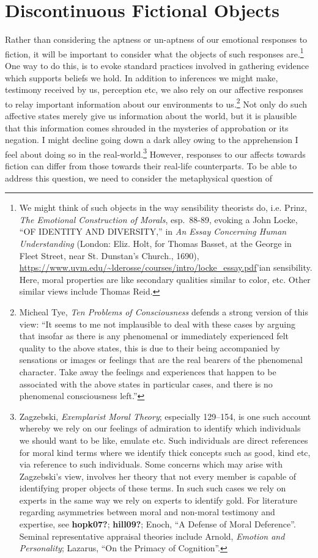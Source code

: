 \documentclass[phdthesis,12pt,final]{wuthesis}
\theoremstyle{definition}
\theoremstyle{definition}
\theoremstyle{definition}
\theoremstyle{definition}
\theoremstyle{remark}
\begin{document}
\section{Discontinuous Fictional Objects}\label{discontinuous-fictional-objects}

Rather than considering the aptness or un-aptness of our emotional responses to fiction, it will be important to consider what the objects of such responses are.\footnote{We might think of such objects in the way sensibility theorists do, i.e. Prinz, \emph{The {Emotional Construction} of {Morals}}, esp.~88-89, evoking a John Locke, {``{OF IDENTITY AND DIVERSITY},''} in \emph{An {Essay Concerning Human Understanding}} (London: Eliz. Holt, for Thomas Basset, at the George in Fleet Street, near St. Dunstan's Church., 1690), \url{https://www.uvm.edu/~lderosse/courses/intro/locke_essay.pdf}'ian sensibility. Here, moral properties are like secondary qualities similar to color, etc. Other similar views include Thomas Reid.} One way to do this, is to evoke standard practices involved in gathering evidence which supports beliefs we hold. In addition to inferences we might make, testimony received by us, perception etc, we also rely on our affective responses to relay important information about our environments to us.\footnote{Micheal Tye, \emph{Ten {Problems} of {Consciousness} } defends a strong version of this view: ``It seems to me not implausible to deal with these cases by arguing that insofar as there is any phenomenal or immediately experienced felt quality to the above states, this is due to their being accompanied by sensations or images or feelings that are the real bearers of the phenomenal character. Take away the feelings and experiences that happen to be associated with the above states in particular cases, and there is no phenomenal consciousness left.''} Not only do such affective states merely give us information about the world, but it is plausible that this information comes shrouded in the mysteries of approbation or its negation. I might decline going down a dark alley owing to the apprehension I feel about doing so in the real-world.\footnote{Zagzebski, \emph{Exemplarist {Moral Theory}}; especially 129--154, is one such account whereby we rely on our feelings of admiration to identify which individuals we should want to be like, emulate etc. Such individuals are direct references for moral kind terms where we identify thick concepts such as good, kind etc, via reference to such individuals. Some concerns which may arise with Zagzebski's view, involves her theory that not every member is capable of identifying proper objects of these terms. In such such cases we rely on experts in the same way we rely on experts to identify gold. For literature regarding asymmetries between moral and non-moral testimony and expertise, see \textbf{hopk07?}; \textbf{hill09?}; Enoch, {``A {Defense} of {Moral Deference}''}. Seminal representative appraisal theories include Arnold, \emph{Emotion and {Personality}}; Lazarus, {``On the {Primacy} of {Cognition}''}.} However, responses to our affects towards fiction can differ from those towards their real-life counterparts. To be able to address this question, we need to consider the metaphysical question of 
\end{document}
